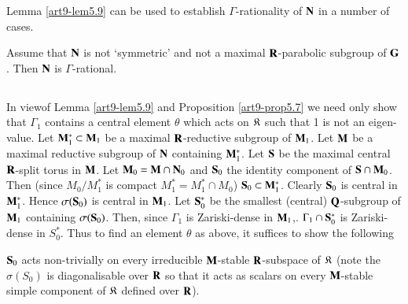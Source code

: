 Lemma \ref{art9-lem5.9} can be used to establish $\Gamma$-rationality of $\mathbf{N}$ in a number of cases.

\begin{proposition}\label{art9-prop5.10}
Assume that $\mathbf{N}$ is not `symmetric' and not a maximal $\mathbf{R}$-parabolic subgroup of $\mathbf{G}$. Then $\mathbf{N}$ is $\Gamma$-rational.
\end{proposition}

\subsection{}\label{art9-subsec5.11}
In view\pageoriginale of Lemma \ref{art9-lem5.9} and Proposition \ref{art9-prop5.7} we need only show that $\Gamma_1$ contains a central element $\theta$ which acts on $\mathfrak{K}$ such that 1 is not an eigen-value. Let $\mathbf{M}^\ast_1 \subset \mathbf{M}_1$ be a maximal $\mathbf{R}$-reductive subgroup of $\mathbf{M}_1$. Let $\mathbf{M}$ be a maximal reductive subgroup of $\mathbf{N}$ containing $\mathbf{M}^\ast_1$. Let $\mathbf{S}$ be the maximal central $\mathbf{R}$-split torus in $\mathbf{M}$. Let $\mathbf{M}_0 = \mathbf{M} \cap \mathbf{N}_0$ and $\mathbf{S}_0$ the identity component of $\mathbf{S} \cap \mathbf{M}_0$. Then (since $M_0/M^\ast_1$ is compact $M^\ast_1 = M^\ast_1 \cap M_0$) $\mathbf{S}_0 \subset \mathbf{M}^\ast_1$. Clearly $\mathbf{S}_0$ is central in $\mathbf{M}^\ast_1$. Hence $\sigma (\mathbf{S}_0)$ is central in $\mathbf{M}_1$. Let $\mathbf{S}^\ast_0$ be the smallest (central) $\mathbf{Q}$-subgroup of $\mathbf{M}_1$ containing $\sigma (\mathbf{S}_0)$.  Then, since $\Gamma_1$ is Zariski-dense in $\mathbf{M}_1$,. $\Gamma_1 \cap \mathbf{S}^\ast_0$ is Zariski-dense in $S^\ast_0$. Thus to find an element $\theta$ as above, it suffices to show the following

\begin{claim}\label{art9-claim5.12}
$\mathbf{S}_0$ acts non-trivially on every irreducible $\mathbf{M}$-stable $\mathbf{R}$-subspace of $\mathfrak{K}$ (note the $\sigma (S_0)$ is diagonalisable over $\mathbf{R}$ so that it acts as scalars on every $\mathbf{M}$-stable simple component of $\mathfrak{K}$ defined over $\mathbf{R}$).
\end{claim}

\setcounter{subsection}{12}
